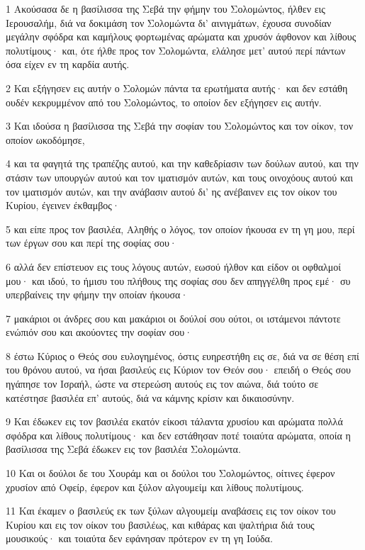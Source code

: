 \par 1 Ακούσασα δε η βασίλισσα της Σεβά την φήμην του Σολομώντος, ήλθεν εις Ιερουσαλήμ, διά να δοκιμάση τον Σολομώντα δι' αινιγμάτων, έχουσα συνοδίαν μεγάλην σφόδρα και καμήλους φορτωμένας αρώματα και χρυσόν άφθονον και λίθους πολυτίμους· και, ότε ήλθε προς τον Σολομώντα, ελάλησε μετ' αυτού περί πάντων όσα είχεν εν τη καρδία αυτής.
\par 2 Και εξήγησεν εις αυτήν ο Σολομών πάντα τα ερωτήματα αυτής· και δεν εστάθη ουδέν κεκρυμμένον από του Σολομώντος, το οποίον δεν εξήγησεν εις αυτήν.
\par 3 Και ιδούσα η βασίλισσα της Σεβά την σοφίαν του Σολομώντος και τον οίκον, τον οποίον ωκοδόμησε,
\par 4 και τα φαγητά της τραπέζης αυτού, και την καθεδρίασιν των δούλων αυτού, και την στάσιν των υπουργών αυτού και τον ιματισμόν αυτών, και τους οινοχόους αυτού και τον ιματισμόν αυτών, και την ανάβασιν αυτού δι' ης ανέβαινεν εις τον οίκον του Κυρίου, έγεινεν έκθαμβος·
\par 5 και είπε προς τον βασιλέα, Αληθής ο λόγος, τον οποίον ήκουσα εν τη γη μου, περί των έργων σου και περί της σοφίας σου·
\par 6 αλλά δεν επίστευον εις τους λόγους αυτών, εωσού ήλθον και είδον οι οφθαλμοί μου· και ιδού, το ήμισυ του πλήθους της σοφίας σου δεν απηγγέλθη προς εμέ· συ υπερβαίνεις την φήμην την οποίαν ήκουσα·
\par 7 μακάριοι οι άνδρες σου και μακάριοι οι δούλοί σου ούτοι, οι ιστάμενοι πάντοτε ενώπιόν σου και ακούοντες την σοφίαν σου·
\par 8 έστω Κύριος ο Θεός σου ευλογημένος, όστις ευηρεστήθη εις σε, διά να σε θέση επί του θρόνου αυτού, να ήσαι βασιλεύς εις Κύριον τον Θεόν σου· επειδή ο Θεός σου ηγάπησε τον Ισραήλ, ώστε να στερεώση αυτούς εις τον αιώνα, διά τούτο σε κατέστησε βασιλέα επ' αυτούς, διά να κάμνης κρίσιν και δικαιοσύνην.
\par 9 Και έδωκεν εις τον βασιλέα εκατόν είκοσι τάλαντα χρυσίου και αρώματα πολλά σφόδρα και λίθους πολυτίμους· και δεν εστάθησαν ποτέ τοιαύτα αρώματα, οποία η βασίλισσα της Σεβά έδωκεν εις τον βασιλέα Σολομώντα.
\par 10 Και οι δούλοι δε του Χουράμ και οι δούλοι του Σολομώντος, οίτινες έφερον χρυσίον από Οφείρ, έφερον και ξύλον αλγουμείμ και λίθους πολυτίμους.
\par 11 Και έκαμεν ο βασιλεύς εκ των ξύλων αλγουμείμ αναβάσεις εις τον οίκον του Κυρίου και εις τον οίκον του βασιλέως, και κιθάρας και ψαλτήρια διά τους μουσικούς· και τοιαύτα δεν εφάνησαν πρότερον εν τη γη Ιούδα.
